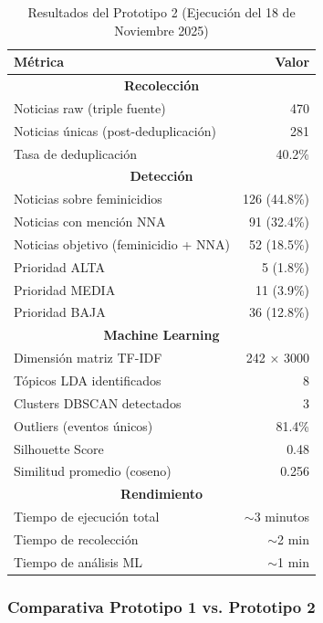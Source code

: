 \begin{table}[h]
\centering
\caption{Resultados del Prototipo 2 (Ejecución del 18 de Noviembre 2025)}
\begin{tabular}{|l|r|}
\hline
\textbf{Métrica} & \textbf{Valor} \\ \hline
\multicolumn{2}{|c|}{\textbf{Recolección}} \\ \hline
Noticias raw (triple fuente) & 470 \\ \hline
Noticias únicas (post-deduplicación) & 281 \\ \hline
Tasa de deduplicación & 40.2\% \\ \hline
\multicolumn{2}{|c|}{\textbf{Detección}} \\ \hline
Noticias sobre feminicidios & 126 (44.8\%) \\ \hline
Noticias con mención NNA & 91 (32.4\%) \\ \hline
Noticias objetivo (feminicidio + NNA) & 52 (18.5\%) \\ \hline
Prioridad ALTA & 5 (1.8\%) \\ \hline
Prioridad MEDIA & 11 (3.9\%) \\ \hline
Prioridad BAJA & 36 (12.8\%) \\ \hline
\multicolumn{2}{|c|}{\textbf{Machine Learning}} \\ \hline
Dimensión matriz TF-IDF & 242 × 3000 \\ \hline
Tópicos LDA identificados & 8 \\ \hline
Clusters DBSCAN detectados & 3 \\ \hline
Outliers (eventos únicos) & 81.4\% \\ \hline
Silhouette Score & 0.48 \\ \hline
Similitud promedio (coseno) & 0.256 \\ \hline
\multicolumn{2}{|c|}{\textbf{Rendimiento}} \\ \hline
Tiempo de ejecución total & $\sim$3 minutos \\ \hline
Tiempo de recolección & $\sim$2 min \\ \hline
Tiempo de análisis ML & $\sim$1 min \\ \hline
\end{tabular}
\end{table}

\subsubsection{Comparativa Prototipo 1 vs. Prototipo 2}

